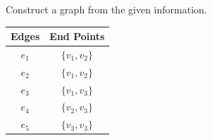 \begin{practiceprob}
Construct a graph from the given information.\vspace{\baselineskip}

    \begin{tabular}{|c|c|}\hline
         Edges & End Points \tabularnewline\hline
         \(e_1\) & \(\{v_1,v_2\}\) \tabularnewline\hline
         \(e_2\) & \(\{v_1,v_2\}\) \tabularnewline\hline
         \(e_3\) & \(\{v_1,v_3\}\) \tabularnewline\hline
         \(e_4\) & \(\{v_2,v_3\}\) \tabularnewline\hline
         \(e_5\) & \(\{v_3,v_3\}\) \tabularnewline\hline
    \end{tabular}\vspace{5\baselineskip}

\end{practiceprob}

